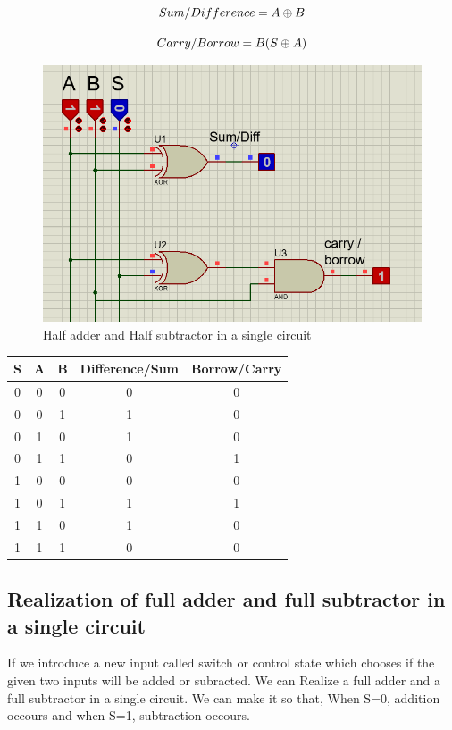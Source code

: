 \documentclass[a4paper, 12pt]{article}
\begin{document}
\begin{equation}
	Sum/Difference = A \oplus B \\
\end{equation}

\begin{equation}
	Carry/Borrow = B(S \oplus A) \\
\end{equation}

\begin{figure}[h]
	\centering
	\includegraphics[scale=0.6]{half-adder-sub.png}
	\caption{Half adder and Half subtractor in a single circuit}
\end{figure}
\begin{center}
	\begin{tabular}[h]{|c|c|c|c|c|}
	\hline
	S & A & B & Difference/Sum & Borrow/Carry \\
	\hline
	0 & 0 & 0 & 0 & 0 \\
	0 & 0 & 1 & 1 & 0 \\
	0 & 1 & 0 & 1 & 0 \\
	0 & 1 & 1 & 0 & 1 \\
	1 & 0 & 0 & 0 & 0 \\
	1 & 0 & 1 & 1 & 1 \\
	1 & 1 & 0 & 1 & 0 \\
	1 & 1 & 1 & 0 & 0 \\
	\hline
	\end{tabular}
\end{center}
\pagebreak

\subsection{Realization of full adder and full subtractor in a single circuit}
If we introduce a new input called switch or control state which chooses if the given two inputs will be added or subracted. We can Realize
a full adder and a full subtractor in a single circuit. We can make it so that, When S=0, addition occours and when S=1, subtraction occours.
\end{document}
